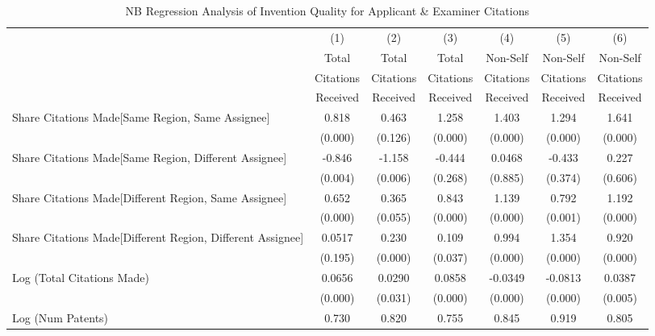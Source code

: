 \begin{table}[htbp]\centering \caption{NB Regression Analysis of Invention Quality for Applicant \& Examiner Citations \label{ae.model123192021}} 
\scriptsize
\singlespacing
\begin{tabular}{l*{6}{c}} \hline\hline
                &\multicolumn{1}{c}{(1)}&\multicolumn{1}{c}{(2)}&\multicolumn{1}{c}{(3)}&\multicolumn{1}{c}{(4)}&\multicolumn{1}{c}{(5)}&\multicolumn{1}{c}{(6)}\\
                &\multicolumn{1}{c}{Total}&\multicolumn{1}{c}{Total}&\multicolumn{1}{c}{Total}&\multicolumn{1}{c}{Non-Self}&\multicolumn{1}{c}{Non-Self}&\multicolumn{1}{c}{Non-Self}\\
                &\multicolumn{1}{c}{Citations}&\multicolumn{1}{c}{Citations}&\multicolumn{1}{c}{Citations}&\multicolumn{1}{c}{Citations}&\multicolumn{1}{c}{Citations}&\multicolumn{1}{c}{Citations}\\
                 &\multicolumn{1}{c}{Received}&\multicolumn{1}{c}{Received}&\multicolumn{1}{c}{Received}&\multicolumn{1}{c}{Received}&\multicolumn{1}{c}{Received}&\multicolumn{1}{c}{Received}\\
\hline
Share Citations Made[Same Region, Same Assignee]&    0.818&    0.463&    1.258&    1.403&    1.294&    1.641\\
                &  (0.000)&  (0.126)&  (0.000)&  (0.000)&  (0.000)&  (0.000)\\
Share Citations Made[Same Region, Different Assignee]&   -0.846&   -1.158&   -0.444&   0.0468&   -0.433&    0.227\\
                &  (0.004)&  (0.006)&  (0.268)&  (0.885)&  (0.374)&  (0.606)\\
Share Citations Made[Different Region, Same Assignee]&    0.652&    0.365&    0.843&    1.139&    0.792&    1.192\\
                &  (0.000)&  (0.055)&  (0.000)&  (0.000)&  (0.001)&  (0.000)\\
Share Citations Made[Different Region, Different Assignee]&   0.0517&    0.230&    0.109&    0.994&    1.354&    0.920\\
                &  (0.195)&  (0.000)&  (0.037)&  (0.000)&  (0.000)&  (0.000)\\
Log (Total Citations Made)&   0.0656&   0.0290&   0.0858&  -0.0349&  -0.0813&   0.0387\\
                &  (0.000)&  (0.031)&  (0.000)&  (0.000)&  (0.000)&  (0.005)\\
Log (Num Patents)&    0.730&    0.820&    0.755&    0.845&    0.919&    0.805\\

\end{tabular}
\end{table}

